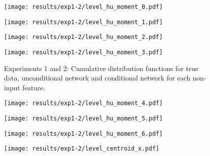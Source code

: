 \begin{figure}[ht]
	
	\begin{minipage}[b]{0.45\linewidth}
		\centering
		\texttt{[image: results/exp1-2/level\_hu\_moment\_0.pdf]} 
		\label{fig:results-noninput-level_hu_moment_0}
	\end{minipage}
	\begin{minipage}[b]{0.45\linewidth}
		\centering
		\texttt{[image: results/exp1-2/level\_hu\_moment\_1.pdf]} 
		\label{fig:results-noninput-level_hu_moment_1}
	\end{minipage} 
	
	
	\begin{minipage}[b]{0.45\linewidth}
		\centering
		\texttt{[image: results/exp1-2/level\_hu\_moment\_2.pdf]} 
		\label{fig:results-noninput-level_hu_moment_2}
	\end{minipage}
	\begin{minipage}[b]{0.45\linewidth}
		\centering
		\texttt{[image: results/exp1-2/level\_hu\_moment\_3.pdf]} 
		\label{fig:results-noninput-level_hu_moment_3}
	\end{minipage} 
	
	
	\caption[Graphical results for experiments 1 and 2]{Experiments 1 and 2: Cumulative distribution functions for true data, unconditional network and conditional network for each non-input feature.}
\end{figure}\begin{figure}[ht]
	\begin{minipage}[b]{0.45\linewidth}
		\centering
		\texttt{[image: results/exp1-2/level\_hu\_moment\_4.pdf]} 
		\label{fig:results-noninput-level_hu_moment_4}
	\end{minipage}
	\begin{minipage}[b]{0.45\linewidth}
		\centering
		\texttt{[image: results/exp1-2/level\_hu\_moment\_5.pdf]} 
		\label{fig:results-noninput-level_hu_moment_5}
	\end{minipage} 
	
	
	\begin{minipage}[b]{0.45\linewidth}
		\centering
		\texttt{[image: results/exp1-2/level\_hu\_moment\_6.pdf]} 
		\label{fig:results-noninput-level_hu_moment_6}
	\end{minipage}
	\begin{minipage}[b]{0.45\linewidth}
		\centering
		\texttt{[image: results/exp1-2/level\_centroid\_x.pdf]} 
		\label{fig:results-noninput-level_centroid_x}
	\end{minipage} 
	

\end{figure}
